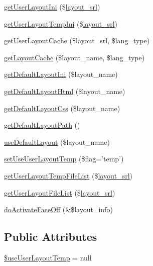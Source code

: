 \begin{DoxyCompactItemize}
\item 
\hyperlink{classlayoutModel_ae52b6a4a0f82631f23b6af7603c0a30e}{get\+User\+Layout\+Ini} (\$\hyperlink{ko_8install_8php_a70054876db09b2519a1726663c8dd9e7}{layout\+\_\+srl})
\item 
\hyperlink{classlayoutModel_a0de830b5db7303b6909568dfdfad2ac3}{get\+User\+Layout\+Temp\+Ini} (\$\hyperlink{ko_8install_8php_a70054876db09b2519a1726663c8dd9e7}{layout\+\_\+srl})
\item 
\hyperlink{classlayoutModel_a54bdf5ad29661e7d2e97e4831cf8832c}{get\+User\+Layout\+Cache} (\$\hyperlink{ko_8install_8php_a70054876db09b2519a1726663c8dd9e7}{layout\+\_\+srl}, \$lang\+\_\+type)
\item 
\hyperlink{classlayoutModel_a2be1cf38e19cd3f79f2f8722c9febec8}{get\+Layout\+Cache} (\$layout\+\_\+name, \$lang\+\_\+type)
\item 
\hyperlink{classlayoutModel_a983d5b4ff865d15ee237385b1c82b5e5}{get\+Default\+Layout\+Ini} (\$layout\+\_\+name)
\item 
\hyperlink{classlayoutModel_a1ec8ba060697878271fc70fbc0ce2867}{get\+Default\+Layout\+Html} (\$layout\+\_\+name)
\item 
\hyperlink{classlayoutModel_a986cf32677527f2efeacb8e5c2bc68e6}{get\+Default\+Layout\+Css} (\$layout\+\_\+name)
\item 
\hyperlink{classlayoutModel_a446c397aaf30fa592cba675f2fbb9495}{get\+Default\+Layout\+Path} ()
\item 
\hyperlink{classlayoutModel_a85dfbba773c086806d4d8c9586d16e52}{use\+Default\+Layout} (\$layout\+\_\+name)
\item 
\hyperlink{classlayoutModel_a513d5dde919e55e29c25889729d087a1}{set\+Use\+User\+Layout\+Temp} (\$flag='temp')
\item 
\hyperlink{classlayoutModel_a64f8b7f26a864b7c64d491a83bbf3961}{get\+User\+Layout\+Temp\+File\+List} (\$\hyperlink{ko_8install_8php_a70054876db09b2519a1726663c8dd9e7}{layout\+\_\+srl})
\item 
\hyperlink{classlayoutModel_a068c761aeebdbc423b005a2e793b1b21}{get\+User\+Layout\+File\+List} (\$\hyperlink{ko_8install_8php_a70054876db09b2519a1726663c8dd9e7}{layout\+\_\+srl})
\item 
\hyperlink{classlayoutModel_a09e314ac34d65617cbfd2f1aa5f097a8}{do\+Activate\+Face\+Off} (\&\$layout\+\_\+info)
\end{DoxyCompactItemize}
\subsection*{Public Attributes}
\begin{DoxyCompactItemize}
\item 
\hyperlink{classlayoutModel_a51f307edec8ca62a4cbaffb4833b2d20}{\$use\+User\+Layout\+Temp} = null
\end{DoxyCompactItemize}



